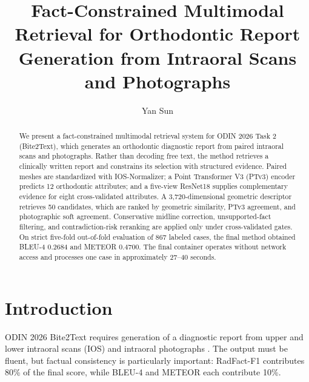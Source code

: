 \documentclass[runningheads]{llncs}
\begin{document}
\title{Fact-Constrained Multimodal Retrieval for Orthodontic Report Generation from Intraoral Scans and Photographs}

\author{Yan Sun}

\maketitle

\begin{abstract}
We present a fact-constrained multimodal retrieval system for ODIN 2026 Task 2 (Bite2Text), which generates an orthodontic diagnostic report from paired intraoral scans and photographs. Rather than decoding free text, the method retrieves a clinically written report and constrains its selection with structured evidence. Paired meshes are standardized with IOS-Normalizer; a Point Transformer V3 (PTv3) encoder predicts 12 orthodontic attributes; and a five-view ResNet18 supplies complementary evidence for eight cross-validated attributes. A 3,720-dimensional geometric descriptor retrieves 50 candidates, which are ranked by geometric similarity, PTv3 agreement, and photographic soft agreement. Conservative midline correction, unsupported-fact filtering, and contradiction-risk reranking are applied only under cross-validated gates. On strict five-fold out-of-fold evaluation of 867 labeled cases, the final method obtained BLEU-4 0.2684 and METEOR 0.4700. The final container operates without network access and processes one case in approximately 27--40 seconds.

\end{abstract}

\section{Introduction}

ODIN 2026 Bite2Text requires generation of a diagnostic report from upper and lower intraoral scans (IOS) and intraoral photographs \cite{odin2026}. The output must be fluent, but factual consistency is particularly important: RadFact-F1 contributes 80\% of the final score, while BLEU-4 and METEOR each contribute 10\%.
\end{document}
